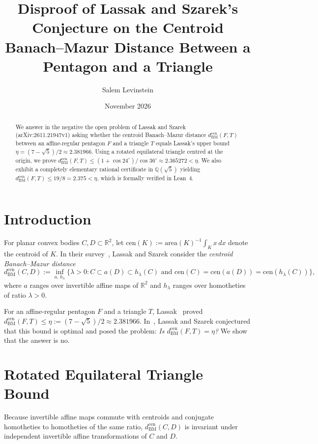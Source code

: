 \documentclass[11pt]{article}
\title{Disproof of Lassak and Szarek's Conjecture on the Centroid Banach--Mazur Distance Between a Pentagon and a Triangle}
\author{Salem Levinstein}
\date{November 2026}
\begin{document}
\maketitle

\begin{abstract}
We answer in the negative the open problem of Lassak and Szarek
(arXiv:2611.21947v1) asking whether the centroid Banach--Mazur distance
$d_{\mathrm{BM}}^{\mathrm{cen}}(F, T)$ between an affine-regular pentagon $F$
and a triangle $T$ equals Lassak's upper bound
$\eta = (7 - \sqrt{5})/2 \approx 2.381966$. Using a rotated equilateral
triangle centred at the origin, we prove
$d_{\mathrm{BM}}^{\mathrm{cen}}(F, T) \le (1 + \cos 24^\circ)/\cos 36^\circ
\approx 2.365272 < \eta$. We also exhibit a completely elementary rational
certificate in $\mathbb{Q}(\sqrt{5})$ yielding
$d_{\mathrm{BM}}^{\mathrm{cen}}(F, T) \le 19/8 = 2.375 < \eta$, which is
formally verified in Lean~4.
\end{abstract}

\section{Introduction}

For planar convex bodies $C, D \subset \mathbb{R}^2$, let $\mathrm{cen}(K) :=
\mathrm{area}(K)^{-1} \int_K x\,dx$ denote the centroid of $K$. In their
survey~\cite{LS2026}, Lassak and Szarek consider the \emph{centroid
Banach--Mazur distance}
\[
d_{\mathrm{BM}}^{\mathrm{cen}}(C, D)
:= \inf_{a,\, h_\lambda}
\bigl\{\lambda > 0 : C \subset a(D) \subset h_\lambda(C) \text{ and }
\mathrm{cen}(C) = \mathrm{cen}(a(D)) = \mathrm{cen}(h_\lambda(C))\bigr\},
\]
where $a$ ranges over invertible affine maps of $\mathbb{R}^2$ and $h_\lambda$
ranges over homotheties of ratio $\lambda > 0$.

For an affine-regular pentagon $F$ and a triangle $T$, Lassak~\cite{L2024}
proved $d_{\mathrm{BM}}^{\mathrm{cen}}(F, T) \le \eta := (7 - \sqrt{5})/2
\approx 2.381966$. In~\cite{LS2026}, Lassak and Szarek conjectured that this
bound is optimal and posed the problem: \emph{Is
$d_{\mathrm{BM}}^{\mathrm{cen}}(F, T) = \eta$?} We show that the answer is no.

\section{Rotated Equilateral Triangle Bound}

Because invertible affine maps commute with centroids and conjugate homotheties
to homotheties of the same ratio, $d_{\mathrm{BM}}^{\mathrm{cen}}(C, D)$ is
invariant under independent invertible affine transformations of $C$ and $D$.
\end{document}
